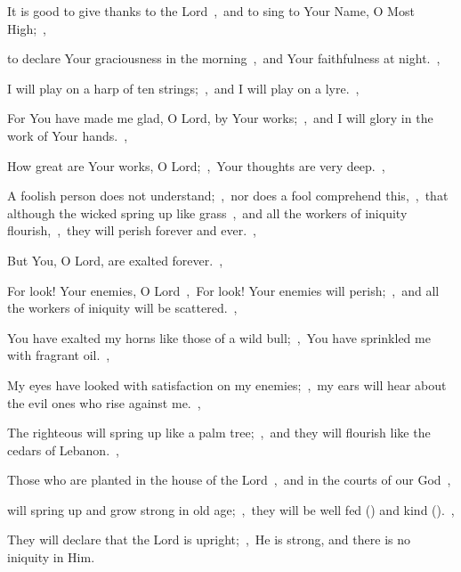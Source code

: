 \documentclass[12pt,twoside,a5paper]{article}
\begin{document}
\begin{halfparskip}
   It is good to give thanks to the Lord~\sep\ and to sing to Your Name, O Most High;~\sep

  to declare Your graciousness in the morning~\sep\ and Your faithfulness at night.~\sep

  I will play on a harp of ten strings;~\sep\ and I will play on a lyre.~\sep

  For You have made me glad, O Lord, by Your works;~\sep\ and I will glory in the work of Your hands.~\sep

  How great are Your works, O Lord;~\sep\ Your thoughts are very deep.~\sep

  A foolish person does not understand;~\sep\ nor does a fool comprehend this,~\sep\ that although the wicked spring up like grass~\sep\ and all the workers of iniquity flourish,~\sep\ they will perish forever and ever.~\sep

  But You, O Lord, are exalted forever.~\sep

  For look! Your enemies, O Lord~\sep\ For look! Your enemies will perish;~\sep\ and all the workers of iniquity will be scattered.~\sep

  You have exalted my horns like those of a wild bull;~\sep\ You have sprinkled me with fragrant oil.~\sep

  My eyes have looked with satisfaction on my enemies;~\sep\ my ears will hear about the evil ones who rise against me.~\sep

  The righteous will spring up like a palm tree;~\sep\ and they will flourish like the cedars of Lebanon.~\sep

  Those who are planted in the house of the Lord~\sep\ and in the courts of our God~\sep

  will spring up and grow strong in old age;~\sep\ they will be well fed () and kind ().~\sep

  They will declare that the Lord is upright;~\sep\ He is strong, and there is no iniquity in Him.
\end{halfparskip}

\end{document}
